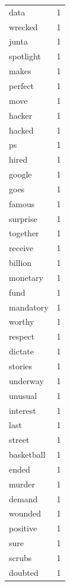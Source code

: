 \begin{tabular}{lr}
data & 1 \\
wrecked & 1 \\
junta & 1 \\
spotlight & 1 \\
makes & 1 \\
perfect & 1 \\
move & 1 \\
hacker & 1 \\
hacked & 1 \\
ps & 1 \\
hired & 1 \\
google & 1 \\
goes & 1 \\
famous & 1 \\
surprise & 1 \\
together & 1 \\
receive & 1 \\
billion & 1 \\
monetary & 1 \\
fund & 1 \\
mandatory & 1 \\
worthy & 1 \\
respect & 1 \\
dictate & 1 \\
stories & 1 \\
underway & 1 \\
unusual & 1 \\
interest & 1 \\
last & 1 \\
street & 1 \\
basketball & 1 \\
ended & 1 \\
murder & 1 \\
demand & 1 \\
wounded & 1 \\
positive & 1 \\
sure & 1 \\
scrubs & 1 \\
doubted & 1 \\
\bottomrule
\end{tabular}
